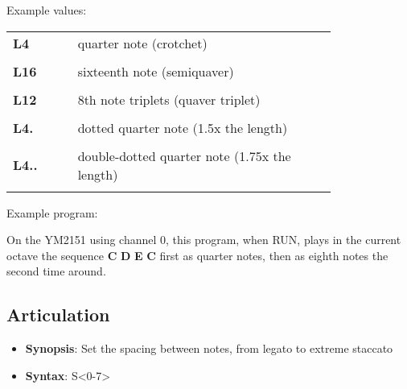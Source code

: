 \vspace{16pt}

Example values:\\

\begin{tabular}{l p{0.8\linewidth}}

	{\ttfamily\bfseries L4} & quarter note (crotchet)\\\\

	{\ttfamily\bfseries L16} & sixteenth note (semiquaver)\\\\

	{\ttfamily\bfseries L12} & 8th note triplets (quaver triplet)\\\\

	{\ttfamily\bfseries L4.} & dotted quarter note (1.5x the length)\\\\

	{\ttfamily\bfseries L4..} & double-dotted quarter note (1.75x the length)\\\\

\end{tabular}

\vspace{16pt}

Example program:\\


On the YM2151 using channel 0, this program, when RUN, plays in the current
octave the sequence {\ttfamily\bfseries C} {\ttfamily\bfseries D}
{\ttfamily\bfseries E} {\ttfamily\bfseries C} first as quarter notes, then as
eighth notes the second time around.\\

\subsection{Articulation}

\begin{itemize}

	\item {\bfseries Synopsis}: Set the spacing between notes, from legato to extreme staccato

	\item {\bfseries Syntax}: {\ttfamily S<0-7>}

\end{itemize}

